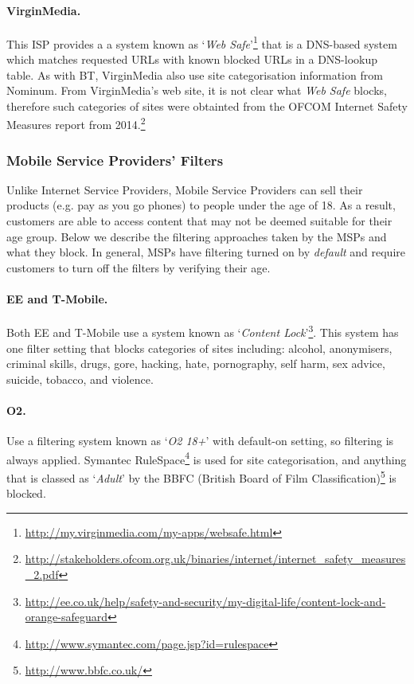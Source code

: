 \documentclass{bmcart}
\begin{document}
\paragraph{VirginMedia.} 
This ISP provides a a system known as `\textit{Web Safe}'\footnote{\url{http://my.virginmedia.com/my-apps/websafe.html}} that is a DNS-based system which matches requested URLs with known blocked URLs in a DNS-lookup table.
As with BT, VirginMedia also use site categorisation information from Nominum.
From VirginMedia's web site, it is not clear what \textit{Web Safe} blocks, therefore such categories of sites were obtainted from the OFCOM Internet Safety Measures report from 2014.\footnote{\url{http://stakeholders.ofcom.org.uk/binaries/internet/internet_safety_measures_2.pdf}}


\subsubsection*{Mobile Service Providers' Filters}
Unlike Internet Service Providers, Mobile Service Providers can sell their products (e.g. pay as you go phones) to people under the age of 18.
As a result, customers are able to access content that may not be deemed suitable for their age group.
Below we describe the filtering approaches taken by the MSPs and what they block.
In general, MSPs have filtering turned on by \textit{default} and require customers to turn off the filters by verifying their age.

\paragraph{EE and T-Mobile.}
Both EE and T-Mobile use a system known as `\textit{Content Lock}'\footnote{\url{http://ee.co.uk/help/safety-and-security/my-digital-life/content-lock-and-orange-safeguard}}.
This system has one filter setting that blocks categories of sites including: alcohol, anonymisers, criminal skills, drugs, gore, hacking, hate, pornography, self harm, sex advice, suicide, tobacco, and violence.

\paragraph{O2.}
Use a filtering system known as `\textit{O2 18+}' with default-on setting, so filtering is always applied.
Symantec RuleSpace\footnote{\url{http://www.symantec.com/page.jsp?id=rulespace}} is used for site categorisation, and anything that is classed as `\textit{Adult}' by the BBFC (British Board of Film Classification)\footnote{\url{http://www.bbfc.co.uk/}} is blocked.
\end{document}
